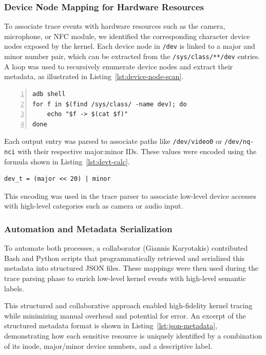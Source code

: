\documentclass[a4paper,12pt]{report}
\begin{document}
\subsubsection{Device Node Mapping for Hardware Resources}

To associate trace events with hardware resources such as the camera, microphone, or NFC module, we identified the corresponding character device nodes exposed by the kernel. Each device node in \texttt{/dev} is linked to a major and minor number pair, which can be extracted from the \texttt{/sys/class/**/dev} entries. A loop was used to recursively enumerate device nodes and extract their metadata, as illustrated in Listing~\ref{lst:device-node-scan}.

\begin{lstlisting}[caption={Enumerating character and block devices with major:minor IDs},label={lst:device-node-scan},numbers=left]
adb shell
for f in $(find /sys/class/ -name dev); do
    echo "$f -> $(cat $f)"
done
\end{lstlisting}

Each output entry was parsed to associate paths like \texttt{/dev/video0} or \texttt{/dev/nq-nci} with their respective major:minor IDs. These values were encoded using the formula shown in Listing~\ref{lst:devt-calc}.

\begin{lstlisting}[caption={Encoding device number using major and minor},label={lst:devt-calc},numbers=none]
dev_t = (major << 20) | minor
\end{lstlisting}

This encoding was used in the trace parser to associate low-level device accesses with high-level categories such as camera or audio input.

\subsubsection{Automation and Metadata Serialization}

To automate both processes, a collaborator (Giannis Karyotakis) contributed Bash and Python scripts that programmatically retrieved and serialized this metadata into structured JSON files. These mappings were then used during the trace parsing phase to enrich low-level kernel events with high-level semantic labels.

This structured and collaborative approach enabled high-fidelity kernel tracing while minimizing manual overhead and potential for error.
An excerpt of the structured metadata format is shown in Listing~\ref{lst:json-metadata}, demonstrating how each sensitive resource is uniquely identified by a combination of its inode, major/minor device numbers, and a descriptive label.
\end{document}
